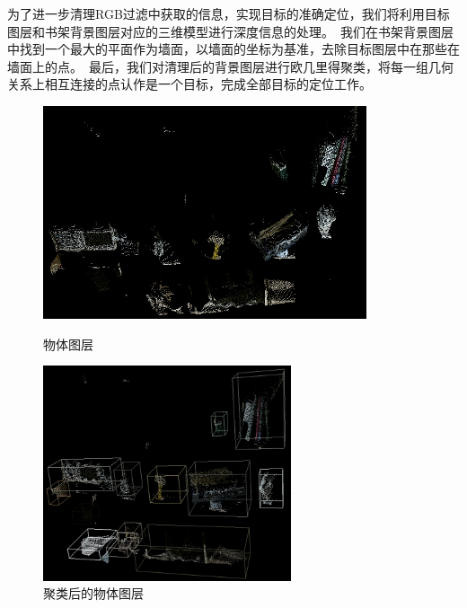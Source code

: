 为了进一步清理RGB过滤中获取的信息，实现目标的准确定位，我们将利用目标图层和书架背景图层对应的三维模型进行深度信息的处理。\ 我们在书架背景图层中找到一个最大的平面作为墙面，以墙面的坐标为基准，去除目标图层中在那些在墙面上的点。\ 最后，我们对清理后的背景图层进行欧几里得聚类，将每一组几何关系上相互连接的点认作是一个目标，完成全部目标的定位工作。\ 

\begin{figure}[H]
\begin{minipage}[t]{0.5\textwidth}
	\centering
    \includegraphics[width = 0.85\textwidth]{images/02.png}
    \caption{物体图层}
    \label{fig:obj}
\end{minipage}
\begin{minipage}[t]{0.5\textwidth}
	\centering
    \includegraphics[width = 0.65\textwidth]{images/03.png}
    \caption{聚类后的物体图层}
    \label{fig:clustering}
\end{minipage}
\end{figure}

